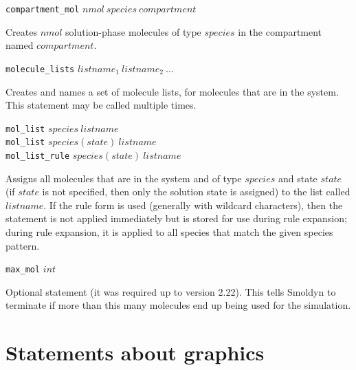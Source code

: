 \documentclass {scrbook}
\newcommand {\ttt} {\texttt}
\begin{document}
\begin{description}
\item{\ttt{compartment\_mol} $nmol\ species\ compartment$}

Creates $nmol$ solution-phase molecules of type $species$ in the compartment named $compartment$.

\item{\ttt{molecule\_lists} $listname_1\ listname_2\ ...$}

Creates and names a set of molecule lists, for molecules that are in the system. This statement may be called multiple times.

\item{\ttt{mol\_list} $species\ listname$\\
\ttt{mol\_list} $species(state)\ listname$\\
\ttt{mol\_list\_rule} $species(state)\ listname$}

Assigns all molecules that are in the system and of type $species$ and state $state$ (if $state$ is not specified, then only the solution state is assigned) to the list called $listname$. If the rule form is used (generally with wildcard characters), then the statement is not applied immediately but is stored for use during rule expansion; during rule expansion, it is applied to all species that match the given species pattern.

\item{\ttt{max\_mol} $int$}

Optional statement (it was required up to version 2.22). This tells Smoldyn to terminate if more than this many molecules end up being used for the simulation.

\end{description}

\section{Statements about graphics}
\end{document}
